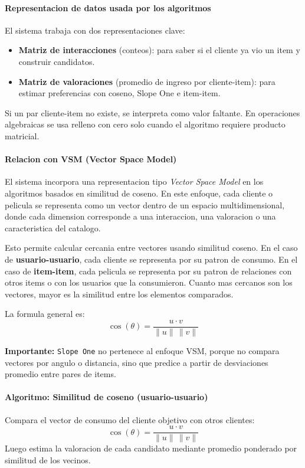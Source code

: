 ﻿\documentclass{article}
\begin{document}
\paragraph{Representacion de datos usada por los algoritmos}
El sistema trabaja con dos representaciones clave:
\begin{itemize}
    \item \textbf{Matriz de interacciones} (conteos): para saber si el cliente ya vio un item y construir candidatos.
    \item \textbf{Matriz de valoraciones} (promedio de ingreso por cliente-item): para estimar preferencias con coseno, Slope One e item-item.
\end{itemize}
Si un par cliente-item no existe, se interpreta como valor faltante. En operaciones algebraicas se usa relleno con cero solo cuando el algoritmo requiere producto matricial.

\paragraph{Relacion con VSM (Vector Space Model)}
El sistema incorpora una representacion tipo \textit{Vector Space Model} en los algoritmos basados en similitud de coseno. En este enfoque, cada cliente o pelicula se representa como un vector dentro de un espacio multidimensional, donde cada dimension corresponde a una interaccion, una valoracion o una caracteristica del catalogo.

Esto permite calcular cercania entre vectores usando similitud coseno. En el caso de \textbf{usuario-usuario}, cada cliente se representa por su patron de consumo. En el caso de \textbf{item-item}, cada pelicula se representa por su patron de relaciones con otros items o con los usuarios que la consumieron. Cuanto mas cercanos son los vectores, mayor es la similitud entre los elementos comparados.

La formula general es:
\[
\cos(\theta)=\frac{u\cdot v}{\|u\|\,\|v\|}
\]

\textbf{Importante:} \texttt{Slope One} no pertenece al enfoque VSM, porque no compara vectores por angulo o distancia, sino que predice a partir de desviaciones promedio entre pares de items.

\paragraph{Algoritmo: Similitud de coseno (usuario-usuario)}
Compara el vector de consumo del cliente objetivo con otros clientes:
\[
\cos(\theta)=\frac{u\cdot v}{\|u\|\,\|v\|}
\]
Luego estima la valoracion de cada candidato mediante promedio ponderado por similitud de los vecinos.
\end{document}
